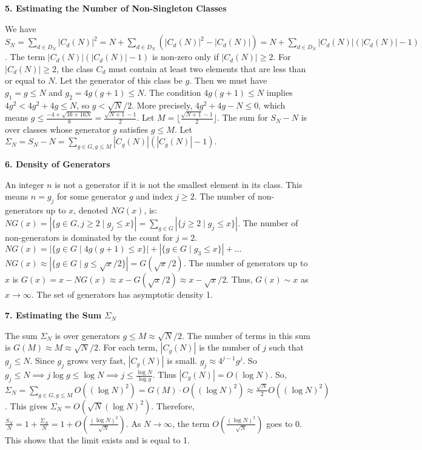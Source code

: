 \documentclass[12pt,a4paper]{article}
\theoremstyle{definition}
\begin{document}
    \textbf{5. Estimating the Number of Non-Singleton Classes}

    We have $S_N = \sum_{d \in D_N} |C_d(N)|^2 = N + \sum_{d \in D_N} (|C_d(N)|^2 - |C_d(N)|) = N + \sum_{d \in D_N} |C_d(N)|(|C_d(N)|-1)$.
    The term $|C_d(N)|(|C_d(N)|-1)$ is non-zero only if $|C_d(N)| \ge 2$.
    For $|C_d(N)| \ge 2$, the class $C_d$ must contain at least two elements that are less than or equal to $N$. Let the generator of this class be $g$. Then we must have $g_1=g \le N$ and $g_2=4g(g+1) \le N$.
    The condition $4g(g+1) \le N$ implies $4g^2 < 4g^2+4g \le N$, so $g < \sqrt{N}/2$.
    More precisely, $4g^2+4g-N \le 0$, which means $g \le \frac{-4+\sqrt{16+16N}}{8} = \frac{\sqrt{N+1}-1}{2}$.
    Let $M = \lfloor \frac{\sqrt{N+1}-1}{2} \rfloor$.
    The sum for $S_N-N$ is over classes whose generator $g$ satisfies $g \le M$.
    Let $\Sigma_N = S_N-N = \sum_{g \in G, g \le M} |C_g(N)|(|C_g(N)|-1)$.

    \textbf{6. Density of Generators}

    An integer $n$ is not a generator if it is not the smallest element in its class. This means $n = g_j$ for some generator $g$ and index $j \ge 2$.
    The number of non-generators up to $x$, denoted $NG(x)$, is:
    $NG(x) = |\{ g \in G, j \ge 2 \mid g_j \le x \}| = \sum_{g \in G} |\{j \ge 2 \mid g_j \le x\}|$.
    The number of non-generators is dominated by the count for $j=2$.
    $NG(x) = |\{g \in G \mid 4g(g+1) \le x\}| + |\{g \in G \mid g_3 \le x\}| + \dots$
    $NG(x) \approx |\{g \in G \mid g \le \sqrt{x}/2\}| = G(\sqrt{x}/2)$.
    The number of generators up to $x$ is $G(x) = x - NG(x) \approx x - G(\sqrt{x}/2) \approx x - \sqrt{x}/2$.
    Thus, $G(x) \sim x$ as $x \to \infty$. The set of generators has asymptotic density 1.

    \textbf{7. Estimating the Sum $\Sigma_N$}

    The sum $\Sigma_N$ is over generators $g \le M \approx \sqrt{N}/2$. The number of terms in this sum is $G(M) \approx M \approx \sqrt{N}/2$.
    For each term, $|C_g(N)|$ is the number of $j$ such that $g_j \le N$. Since $g_j$ grows very fast, $|C_g(N)|$ is small.
    $g_j \approx 4^{j-1}g^j$. So $g_j \le N \implies j \log g \le \log N \implies j \le \frac{\log N}{\log g}$.
    Thus $|C_g(N)| = O(\log N)$.
    So, $\Sigma_N = \sum_{g \in G, g \le M} O((\log N)^2) = G(M) \cdot O((\log N)^2) \approx \frac{\sqrt{N}}{2} O((\log N)^2)$.
    This gives $\Sigma_N = O(\sqrt{N} (\log N)^2)$.
    Therefore, $\frac{S_N}{N} = 1 + \frac{\Sigma_N}{N} = 1 + O\left(\frac{(\log N)^2}{\sqrt{N}}\right)$.
    As $N \to \infty$, the term $O\left(\frac{(\log N)^2}{\sqrt{N}}\right)$ goes to 0.
    This shows that the limit exists and is equal to 1.
\end{document}
